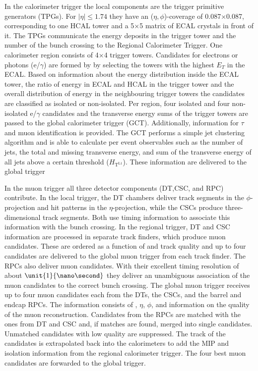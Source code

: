 In the calorimeter trigger the local components are the trigger primitive generators (TPGs). For $\vert \eta \vert \leq 1.74$ they have an ($\eta,\phi$)-coverage of 0.087$\times$0.087, corresponding to one HCAL tower and a 5$\times$5 matrix of ECAL crystals in front of it. The TPGs communicate the energy deposits in the trigger tower and the number of the bunch crossing to the Regional Calorimeter Trigger. One calorimeter region consists of 4$\times$4 trigger towers. Candidates for electrons or photons (e/$\gamma$) are formed by by selecting the towers with the highest $E_T$ in the ECAL. Based on information about the energy distribution inside the ECAL tower, the ratio of energy in ECAL and HCAL in the trigger tower and the overall distribution of energy in the neighbouring trigger towers the candidates are classified as isolated or non-isolated. Per region, four isolated and four non-isolated e/$\gamma$ candidates and the transverse energy sums of the trigger towers are passed to the global calorimeter trigger (GCT). Additionally, information for $\tau$ and muon identification is provided. The GCT performs a simple jet clustering algorithm and is able to calculate per event observables such as the number of jets, the total and missing transverse energy, and sum of the transverse energy of all jets above a certain threshold ($H_{\mathrm{T}^{\mathrm{L1}}}$). These information are delivered to the global trigger

In the muon trigger all three detector components (DT,CSC, and RPC) contribute. In the local trigger, the DT chambers deliver track segments in the $\phi$-projection and hit patterns in the $\eta$-projection, while the CSCs produce three-dimensional track segments. Both use timing information to associate this information with the bunch crossing. In the regional trigger, DT and CSC information are processed in separate track finders, which produce muon candidates. These are ordered as a function of \pt and track quality and up to four candidates are delivered to the global muon trigger from each track finder. The RPCs also deliver muon candidates. With their excellent timing resolution of about $\unit{1}{\nano\second}$ they deliver an unambiguous association of the muon candidates to the correct bunch crossing. The global muon trigger receives up to four muon candidates each from the DTs, the CSCs, and the barrel and endcap RPCs. The information consists of \pt, $\eta$, $\phi$, and information on the quality of the muon reconstruction. Candidates from the RPCs are matched with the ones from DT and CSC and, if matches are found, merged into single candidates. Unmatched candidates with low quality are suppressed. The track of the candidates is extrapolated back into the calorimeters to add the MIP and isolation information from the regional calorimeter trigger. The four best muon candidates are forwarded to the global trigger. 

